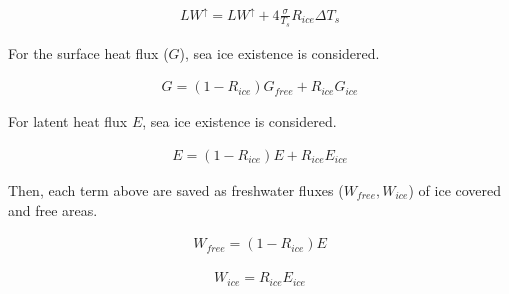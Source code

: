 \begin{eqnarray}
    LW^\uparrow=LW^\uparrow +  4\frac{\sigma}{T_s}R_{ice}  \Delta T_s
\end{eqnarray}

For the surface heat flux (\(G\)), sea ice existence is considered.

\begin{eqnarray}
    G=(1-R_{ice})G_{free} + R_{ice}G_{ice}
\end{eqnarray}

For latent heat flux \(E\), sea ice existence is considered.

\begin{eqnarray}
    E=(1-R_{ice})E + R_{ice}E_{ice}
\end{eqnarray}

Then, each term above are saved as freshwater fluxes
(\(W_{free}, W_{ice}\)) of ice covered and free areas.

\begin{eqnarray}
    W_{free} = (1-R_{ice}) E
\end{eqnarray}

\begin{eqnarray}
    W_{ice} = R_{ice} E_{ice}
\end{eqnarray}
